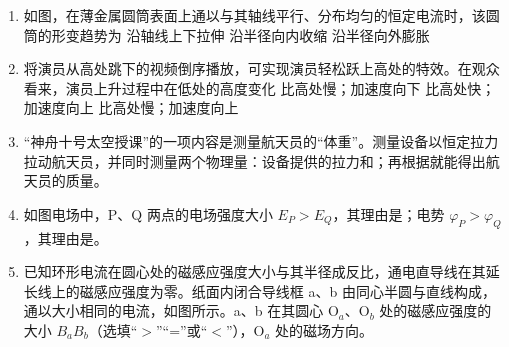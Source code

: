 \documentclass[\gkver]{gaokaozhenti}
\begin{document}
\begin{enumerate}
\item
如图，在薄金属圆筒表面上通以与其轴线平行、分布均匀的恒定电流时，该圆筒的形变趋势为
\onepicture[w=1.66cm]{}
{沿轴线上下拉伸}
{沿半径向内收缩}
{沿半径向外膨胀}

\item
将演员从高处跳下的视频倒序播放，可实现演员轻松跃上高处的特效。在观众看来，演员上升过程中在低处的高度变化
{比高处慢；加速度向下}
{比高处快；加速度向上}
{比高处慢；加速度向上}

\item
“神舟十号太空授课”的一项内容是测量航天员的“体重”。测量设备以恒定拉力拉动航天员，并同时测量两个物理量：设备提供的拉力和；再根据就能得出航天员的质量。

\item
如图电场中，P、Q 两点的电场强度大小 $E_{P} > E_{Q}$，其理由是；电势 $\varphi_{P} > \varphi_{Q}$，其理由是。
\onepicture[align=right, w=4.48cm]{}

\item
已知环形电流在圆心处的磁感应强度大小与其半径成反比，通电直导线在其延长线上的磁感应强度为零。纸面内闭合导线框 a、b 由同心半圆与直线构成，通以大小相同的电流，如图所示。a、b 在其圆心 O$_{a}$、O$_{b}$ 处的磁感应强度的大小 $B_{a}$\tkanswer[1cm]{$<$}$B_{b}$（选填“$>$”“=”或“$<$”），O$_{a}$ 处的磁场方向。
\onepicture[align=right, w=6.96cm]{}


\end{enumerate}
\end{document}
